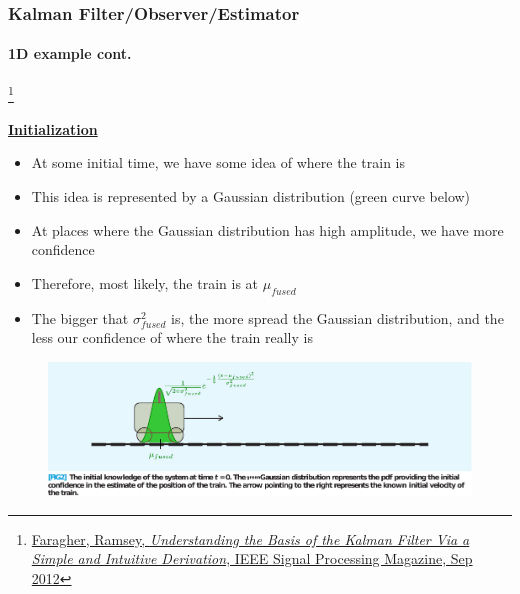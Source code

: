\documentclass{beamer}
\newenvironment{changemargin}[2]
	{
	  	\begin{list}{}
		{
			\setlength{\topsep}{0pt}%
			\setlength{\leftmargin}{#1}%
			\setlength{\rightmargin}{#2}%
			\setlength{\listparindent}{\parindent}%
			\setlength{\itemindent}{\parindent}%
			\setlength{\parsep}{\parskip}%
		}
	  	\item[]
		}
		{\end{list}
	}
\begin{document}
%





\begin{frame}[plain]
\frametitle{Kalman Filter/Observer/Estimator}
\framesubtitle{1D example \tiny cont.}

\footnote{\tiny\hspace{-0.23in} \href{http://www.cl.cam.ac.uk/~rmf25/papers/Understanding the Basis of the Kalman Filter.pdf}{Faragher, Ramsey, \emph{Understanding the Basis of the Kalman Filter Via a Simple and Intuitive Derivation}, IEEE Signal Processing Magazine, Sep 2012}}
\scriptsize
\begin{changemargin}{-1.3in}{0in}
\underline{\textbf{Initialization}}
\begin{itemize}\scriptsize
\item At some initial time, we have some idea of where the train is
\item This idea is represented by a Gaussian distribution (green curve below)
\item At places where the Gaussian distribution has high amplitude, we have more confidence
\item Therefore, most likely, the train is at $\mu_{fused}$
\item The bigger that $\sigma_{fused}^2$ is, the more spread the Gaussian distribution, and the less our confidence of where the train really is
\end{itemize}
\begin{figure}[h]
\centering
\includegraphics[width=1.35\textwidth]{figs/2012_MAG_Understanding_the_Basis_of_the_Kalman_Filter_fig2_mine.pdf}
\end{figure}
\end{changemargin}
\end{frame}
\end{document}

